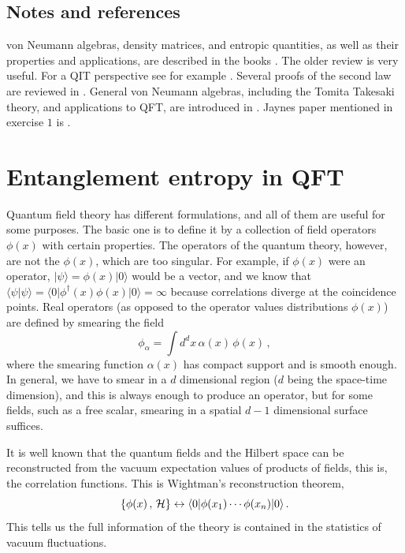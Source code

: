 \documentclass[11pt]{article}
\numberwithin{equation}{section}
\newcommand{\be}{\begin{equation}}
\newcommand{\ee}{\end{equation}}
\begin{document}
\subsection{Notes and references}
 von Neumann algebras, density matrices, and entropic quantities, as well as their properties and applications, are described in the books \cite{ohya2004quantum,petz2007quantum}. The older review \cite{wehrl1978general} is very useful. For a QIT perspective see for example \cite{nielsen2002quantum,vedral}. Several proofs of the second law are reviewed in \cite{sagawa2013second}. General von Neumann algebras, including the Tomita Takesaki theory, and applications to QFT, are introduced in \cite{Haag:1992hx}. Jaynes paper mentioned in exercise $1$ is \cite{jaynes1957information}.

\newpage
 
\section{Entanglement entropy in QFT}
\label{EEQFT}

Quantum field theory has different formulations, and all of them are useful for some purposes. The basic one is to define it by a collection of field operators $\phi(x)$ with certain properties.  The operators of the quantum theory, however, are not the $\phi(x)$, which are too singular. For example, if $\phi(x)$ were an operator, $|\psi\rangle=\phi(x)|0\rangle$ would be a vector, and we know that $\langle \psi|\psi \rangle= \langle 0|\phi^\dagger(x)\phi(x)|0\rangle=\infty$ because correlations diverge at the coincidence points. Real operators (as opposed to the operator values distributions $\phi(x)$) are defined by smearing the field 
\be
\phi_\alpha=\int d^dx\, \alpha(x)\, \phi(x)\,,
\ee
where the smearing function $\alpha(x)$ has compact support and is smooth enough. In general, we have to smear in a $d$ dimensional region ($d$ being the space-time dimension), and this is always enough to produce an operator, but for some fields, such as a free scalar, smearing in a spatial $d-1$ dimensional surface suffices.

It is well known that the quantum fields and the Hilbert space can be reconstructed from the vacuum expectation values of products of fields, this is, the correlation functions. This is Wightman's reconstruction theorem,  
\be
\{\phi(x)\,, \, {\cal H}\} \leftrightarrow \langle 0| \phi(x_1)\cdots \phi(x_n)|0\rangle\,.  \label{recon}
\ee
This tells us the full information of the theory is contained in the statistics of vacuum fluctuations. 
\end{document}

